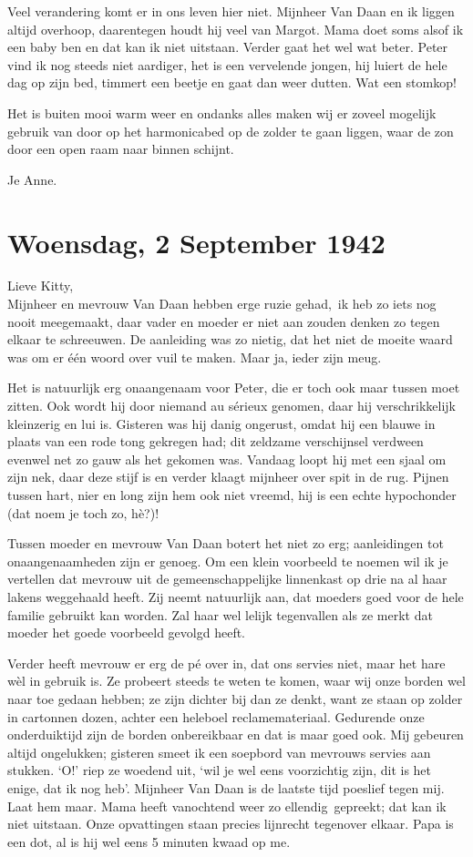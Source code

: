 \documentclass{book}
\begin{document}
Veel verandering komt er in ons leven hier niet. Mijnheer Van Daan en ik
liggen altijd overhoop, daarentegen houdt hij veel van Margot. Mama doet
soms alsof ik een baby ben en dat kan ik niet uitstaan. Verder gaat het
wel wat beter. Peter vind ik nog steeds niet aardiger, het is een
vervelende jongen, hij luiert de hele dag op zijn bed, timmert een
beetje en gaat dan weer dutten. Wat een stomkop!

Het is buiten mooi warm weer en ondanks alles maken wij er zoveel
mogelijk gebruik van door op het harmonicabed op de zolder te gaan
liggen, waar de zon door een open raam naar binnen schijnt.

Je Anne.

\chapter{Woensdag, 2 September 1942}

Lieve Kitty,\\Mijnheer en mevrouw Van Daan hebben erge ruzie gehad,~ik
heb zo iets nog nooit meegemaakt, daar vader en moeder er niet aan
zouden denken zo tegen elkaar te schreeuwen. De aanleiding was zo
nietig, dat het niet de moeite waard was om er één woord over vuil te
maken. Maar ja, ieder zijn meug.

Het is natuurlijk erg onaangenaam voor Peter, die er toch ook maar
tussen moet zitten. Ook wordt hij door niemand au sérieux genomen, daar
hij verschrikkelijk kleinzerig en lui is. Gisteren was hij danig
ongerust, omdat hij een blauwe in plaats van een rode tong gekregen had;
dit zeldzame verschijnsel verdween evenwel net zo gauw als het gekomen
was. Vandaag loopt hij met een sjaal om zijn nek, daar deze stijf is en
verder klaagt mijnheer over spit in de rug. Pijnen tussen hart, nier en
long zijn hem ook niet vreemd, hij is een echte hypochonder (dat noem je
toch zo, hè?)!

Tussen moeder en mevrouw Van Daan botert het niet zo erg; aanleidingen
tot onaangenaamheden zijn er genoeg. Om een klein voorbeeld te noemen
wil ik je vertellen dat mevrouw uit de gemeenschappelijke linnenkast op
drie na al haar lakens weggehaald heeft. Zij neemt natuurlijk aan, dat
moeders goed voor de hele familie gebruikt kan worden. Zal haar wel
lelijk tegenvallen als ze merkt dat moeder het goede voorbeeld gevolgd
heeft.

Verder heeft mevrouw er erg de pé over in, dat ons servies niet, maar
het hare wèl in gebruik is. Ze probeert steeds te weten te komen, waar
wij onze borden wel naar toe gedaan hebben; ze zijn dichter bij dan ze
denkt, want ze staan op zolder in cartonnen dozen, achter een heleboel
reclamemateriaal. Gedurende onze onderduiktijd zijn de borden
onbereikbaar en dat is maar goed ook. Mij gebeuren altijd ongelukken;
gisteren smeet ik een soepbord van mevrouws servies aan stukken. `O!'
riep ze woedend uit, `wil je wel eens voorzichtig zijn, dit is het
enige, dat ik nog heb'. Mijnheer Van Daan is de laatste tijd poeslief
tegen mij. Laat hem maar. Mama heeft vanochtend weer zo
ellendig~gepreekt; dat kan ik niet uitstaan. Onze opvattingen staan
precies lijnrecht tegenover elkaar. Papa is een dot, al is hij wel eens
5 minuten kwaad op me.
\end{document}
